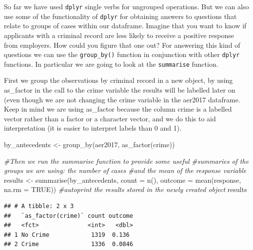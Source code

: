 \documentclass[
]{book}
\newenvironment{Shaded}{\begin{snugshade}}{\end{snugshade}}
\newcommand{\AttributeTok}[1]{\textcolor[rgb]{0.77,0.63,0.00}{#1}}
\newcommand{\CommentTok}[1]{\textcolor[rgb]{0.56,0.35,0.01}{\textit{#1}}}
\newcommand{\ConstantTok}[1]{\textcolor[rgb]{0.00,0.00,0.00}{#1}}
\newcommand{\FunctionTok}[1]{\textcolor[rgb]{0.00,0.00,0.00}{#1}}
\newcommand{\NormalTok}[1]{#1}
\newcommand{\OtherTok}[1]{\textcolor[rgb]{0.56,0.35,0.01}{#1}}
\begin{document}
So far we have used \texttt{dplyr} single verbs for ungrouped operations. But we can also use some of the functionality of \texttt{dplyr} for obtaining answers to questions that relate to groups of cases within our dataframe. Imagine that you want to know if applicants with a criminal record are less likely to receive a positive response from employers. How could you figure that one out? For answering this kind of questions we can use the \texttt{group\_by()} function in conjunction with other \texttt{dplyr} functions. In particular we are going to look at the \texttt{summarise} function.

First we group the observations by criminal record in a new object, by using as\_factor in the call to the crime variable the results will be labelled later on (even though we are not changing the crime variable in the aer2017 dataframe. Keep in mind we are using as\_factor because the column crime is a labelled vector rather than a factor or a character vector, and we do this to aid interpretation (it is easier to
interpret labels than 0 and 1).

\begin{Shaded}
\begin{Highlighting}[]
\NormalTok{by\_antecedents }\OtherTok{\textless{}{-}} \FunctionTok{group\_by}\NormalTok{(aer2017, }\FunctionTok{as\_factor}\NormalTok{(crime))}

\CommentTok{\#Then we run the summarise function to provide some useful}
\CommentTok{\#summaries of the groups we are using: the number of cases}
\CommentTok{\#and the mean of the response variable}
\NormalTok{results }\OtherTok{\textless{}{-}} \FunctionTok{summarise}\NormalTok{(by\_antecedents,}
  \AttributeTok{count =} \FunctionTok{n}\NormalTok{(),}
  \AttributeTok{outcome =} \FunctionTok{mean}\NormalTok{(response, }\AttributeTok{na.rm =} \ConstantTok{TRUE}\NormalTok{))}
\CommentTok{\#autoprint the results stored in the newly created object}
\NormalTok{results}
\end{Highlighting}
\end{Shaded}

\begin{verbatim}
## # A tibble: 2 x 3
##   `as_factor(crime)` count outcome
##   <fct>              <int>   <dbl>
## 1 No Crime            1319  0.136 
## 2 Crime               1336  0.0846
\end{verbatim}
\end{document}
